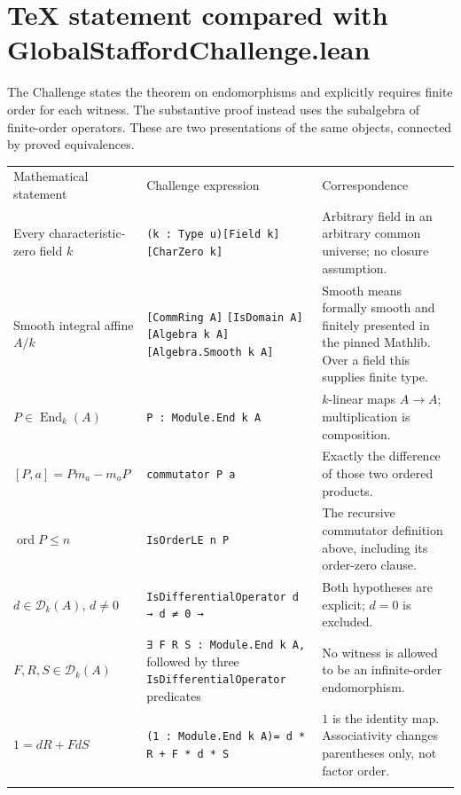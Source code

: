 \documentclass[11pt,a4paper]{article}
\newcommand{\code}[1]{\nolinkurl{#1}}
\newcommand{\D}{\mathcal D}
\newcommand{\ord}{\operatorname{ord}}
\begin{document}
\section{TeX statement compared with GlobalStaffordChallenge.lean}\label{sec:comparison}
The Challenge states the theorem on endomorphisms and explicitly requires
finite order for each witness. The substantive proof instead uses the
subalgebra of finite-order operators. These are two presentations of the same
objects, connected by proved equivalences.

\begin{longtable}{@{}>{\raggedright\arraybackslash}p{}>{\raggedright\arraybackslash}p{}>{\raggedright\arraybackslash}p{}@{}}
\toprule
Mathematical statement & Challenge expression & Correspondence \\ \addlinespace[.4em]
\midrule\endhead
Every characteristic-zero field $k$ & \code{(k : Type u)}\newline \code{[Field k]} \code{[CharZero k]} & Arbitrary field in an arbitrary common universe; no closure assumption. \\ \addlinespace[.4em]
Smooth integral affine $A/k$ & \code{[CommRing A]} \code{[IsDomain A]}\newline \code{[Algebra k A]}\newline \code{[Algebra.Smooth k A]} & Smooth means formally smooth and finitely presented in the pinned Mathlib. Over a field this supplies finite type. \\ \addlinespace[.4em]
$P\in\operatorname{End}_k(A)$ & \code{P : Module.End k A} & $k$-linear maps $A\to A$; multiplication is composition. \\ \addlinespace[.4em]
$[P,a]=Pm_a-m_aP$ & \code{commutator P a} & Exactly the difference of those two ordered products. \\ \addlinespace[.4em]
$\ord P\le n$ & \code{IsOrderLE n P} & The recursive commutator definition above, including its order-zero clause. \\ \addlinespace[.4em]
$d\in\D_k(A)$, $d\ne0$ & \code{IsDifferentialOperator d → d ≠ 0 →} & Both hypotheses are explicit; $d=0$ is excluded. \\ \addlinespace[.4em]
$F,R,S\in\D_k(A)$ & \code{∃ F R S : Module.End k A,} followed by three \code{IsDifferentialOperator} predicates & No witness is allowed to be an infinite-order endomorphism. \\ \addlinespace[.4em]
$1=dR+FdS$ & \code{(1 : Module.End k A)}\newline \code{= d * R + F * d * S} & $1$ is the identity map. Associativity changes parentheses only, not factor order. \\ \addlinespace[.4em]
\bottomrule
\end{longtable}
\end{document}
